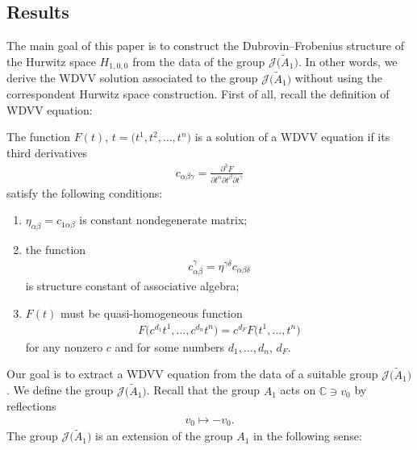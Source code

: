 \documentclass[pdftex]{sigma}%
\numberwithin{equation}{section}
\newcommand{\Ja}{\mathcal{J}}
\begin{document}
\subsection{Results}%

The main goal of this paper is to construct the Dubrovin--Frobenius structure of the Hurwitz space $H_{1,0,0}$ from the data of the group $\Ja\big(\tilde A_1\big)$. In other words, we derive the WDVV solution associated to the group $\Ja\big(\tilde A_1\big)$ without using the correspondent Hurwitz space construction. First of all, recall the definition of WDVV equation:
 \begin{Definition}
The function $F(t)$, $t=\big(t^1,t^2,\dots,t^n\big)$ is a solution of a WDVV equation if its third derivatives
\begin{gather}\label{freeenergy}
c_{\alpha\beta\gamma}=\frac{\partial^3F}{\partial t^{\alpha}\partial t^{\beta}\partial t^{\gamma}}
\end{gather}
satisfy the following conditions:

\begin{enumerate}\itemsep=0pt
\item[1)] $\eta_{\alpha\beta}=c_{1\alpha\beta}$ is constant nondegenerate matrix;
\item[2)] the function
\begin{gather*}
c_{\alpha\beta}^{\gamma}=\eta^{\gamma\delta}c_{\alpha\beta\delta}
\end{gather*}
is structure constant of associative algebra;
\item[3)] $F(t)$ must be quasi-homogeneous function
\begin{gather*}
F\big(c^{d_1}t^1,\dots,c^{d_n}t^n\big)=c^{d_F}F\big(t^1,\dots,t^n\big)
\end{gather*}
for any nonzero $c$ and for some numbers $d_1, \dots , d_n$, $d_F$.
\end{enumerate}
\end{Definition}
Our goal is to extract a WDVV equation from the data of a suitable group $\Ja\big(\tilde A_1\big)$. We define the group $\Ja\big(\tilde A_1\big)$. Recall that the group $A_1$ acts on $\mathbb{C}\ni v_0$ by reflections
 \begin{gather*}
 v_0\mapsto -v_0.
 \end{gather*}
The group $\Ja\big(\tilde A_1\big)$ is an extension of the group $A_1$ in the following sense:
\end{document}
